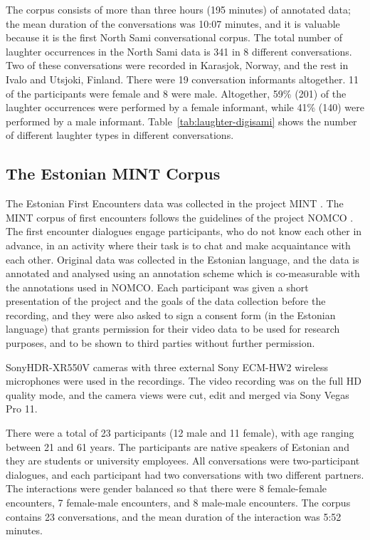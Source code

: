 The corpus consists of more than three hours (195 minutes) of annotated data; the mean duration of the conversations was 10:07 minutes, and it is valuable because it is the first North Sami conversational corpus. The total number of laughter occurrences in the North Sami data is 341 in 8 different conversations. Two of these conversations were recorded in Karasjok, Norway, and the rest in Ivalo and Utsjoki, Finland. There were 19 conversation informants altogether. 11 of the participants were female and 8 were male. Altogether, 59\% (201) of the laughter occurrences were performed by a female informant, while 41\% (140) were performed by a male informant. Table~\ref{tab:laughter-digisami} shows the number of different laughter types in different conversations.

\subsection{The Estonian MINT Corpus}
\label{sec:estonian-mint-corpus}

The Estonian First Encounters data was collected in the project MINT \cite{Jokinen:Tenjes:12}. The MINT corpus of first encounters follows the guidelines of the project NOMCO \cite{Paggio:ea:10}. The first encounter dialogues engage participants, who do not know each other in advance, in an activity where their task is to chat and make acquaintance with each other. Original data was collected in the Estonian language, and the data is annotated and analysed using an annotation scheme which is co-measurable with the annotations used in NOMCO. Each participant was given a short presentation of the project and the goals of the data collection before the recording, and they were also asked to sign a consent form (in the Estonian language) that grants permission for their video data to be used for research purposes, and to be shown to third parties without further permission.

SonyHDR-XR550V cameras with three external Sony ECM-HW2 wireless microphones were used in the recordings. The video recording was on the full HD quality mode, and the camera views were cut, edit and merged via Sony Vegas Pro 11.

There were a total of 23 participants (12 male and 11 female), with age ranging between 21 and 61 years. The participants are native speakers of Estonian and they are students or university employees. All conversations were two-participant dialogues, and each participant had two conversations with two different partners. The interactions were gender balanced so that there were 8 female-female encounters, 7 female-male encounters, and 8 male-male encounters. The corpus contains 23 conversations, and the mean duration of the interaction was 5:52 minutes.

